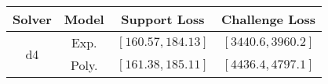 \begin{tabular}{cc|c|c} 
\hline 
 Solver & Model & Support Loss  & Challenge Loss \tabularnewline\hline 
\hline 
\multirow{2}{*}{d4} & Exp. & $\mathbf{\left[160.57,184.13\right]}$ & $\mathbf{\left[3440.6,3960.2\right]}$ \tabularnewline 
 & Poly. & $\left[161.38,185.11\right]$ & $\left[4436.4,4797.1\right]$ \tabularnewline 
\hline 
\end{tabular} 

